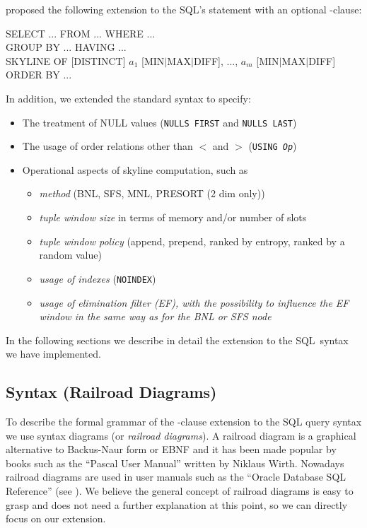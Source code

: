 \citet{Borzsonyi2001} proposed the following extension to the SQL's
 statement with an optional -clause:
\begin{sql}
SELECT ... FROM ... WHERE ... \\
GROUP BY ... HAVING ...       \\
SKYLINE OF \textnormal{[}DISTINCT\textnormal{]} $a_1$ \textnormal{[}MIN$|$MAX$|$DIFF\textnormal{]}, ..., $a_m$ \textnormal{[}MIN$|$MAX$|$DIFF\textnormal{]} \\
ORDER BY ...
\end{sql}
\noindent
In addition, we extended the standard syntax to specify:
\begin{itemize}
\item The treatment of NULL values (\texttt{NULLS FIRST} and \texttt{NULLS LAST})
\item The usage of order relations other than $<$ and $>$ (\texttt{USING \emph{Op}})
\item Operational aspects of skyline computation, such as 
\begin{itemize}
\item \emph{method} (BNL, SFS, MNL, PRESORT (2 dim only))
\item \emph{tuple window size} in terms of memory and/or number of slots
\item \emph{tuple window policy} (append, prepend, ranked by entropy, ranked by a random value)
\item \emph{usage of indexes} (\texttt{NOINDEX})
\item \emph{usage of elimination filter (EF), 
  	with the possibility to influence the EF window in the same way
  	as for the BNL or SFS node}
\end{itemize}
\end{itemize}

In the following sections we describe in detail the extension to the SQL~syntax
we have implemented.

\subsection{Syntax (Railroad Diagrams)}
\label{sec:syntax}
To describe the formal grammar of the -clause
extension to the SQL query syntax we use syntax diagrams (or \emph{railroad
diagrams}).  A railroad diagram is a graphical alternative to
Backus-Naur form or EBNF and it has been made popular by books such
as the ``Pascal User Manual'' written by Niklaus Wirth.  Nowadays
railroad diagrams are used in user manuals such as the ``Oracle
Database SQL Reference'' (see \citep{Oracle2005}).  We believe the
general concept of railroad diagrams is easy to grasp and does not
need a further explanation at this point, so we can directly focus on
our  extension.

